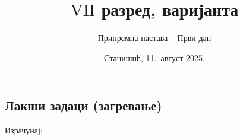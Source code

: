 \documentclass[11pt,a5paper,twoside,addpoints,answers]{exam} %
\title{$\mathrm{VII}$ разред, варијанта \variant{1}{2}{3}}
\author{Припремна настава – Први дан}
\date{Станишић, 11.~август 2025.}
\newcommand{\variant}[3]{#1}
\begin{document}
\maketitle
\thispagestyle{headandfoot}

\begin{center}
\gradetable[h]
\end{center}

\begin{questions}

\section{Лакши задаци (загревање)}

\question[2]
Израчунај:
\begin{multicols}{3}
\end{multicols}
\begin{solution}[\stretch 1]
\begin{parts}
\end{parts}
\end{solution}
\end{questions}
\end{document}
